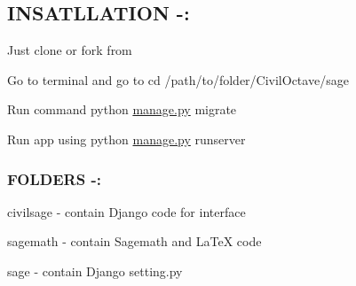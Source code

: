 \subsection*{I\+N\+S\+A\+T\+L\+L\+A\+T\+I\+O\+N -\/\+:}


\begin{DoxyEnumerate}
\item Just clone or fork from
\item Go to terminal and go to cd /path/to/folder/\+Civil\+Octave/sage
\item Run command python \hyperlink{a00020}{manage.\+py} migrate
\item Run app using python \hyperlink{a00020}{manage.\+py} runserver
\end{DoxyEnumerate}

\subsubsection*{F\+O\+L\+D\+E\+R\+S -\/\+:}


\begin{DoxyEnumerate}
\item civilsage -\/ contain Django code for interface
\item sagemath -\/ contain Sagemath and La\+Te\+X code
\item sage -\/ contain Django setting.\+py 
\end{DoxyEnumerate}